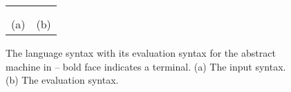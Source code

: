 \newsavebox{\boxLangSyntax}

\begin{lrbox}{\boxLangSyntax}
\begin{minipage}[c]{0.3\linewidth}
\cfgstart
{}
\cfgrule{\thread}{\lp\cfgnt{\cmd}~$\ldots$~$\bot$\rp}
\cfgrule{\cmd}{\lp\cfgt{\sendi}~\cfgt{\num}~\cfgt{\num}\rp}
   \cfgorline{\lp\cfgt{\recvi}~\cfgt{\aid}~\cfgt{\num}~\cfgt{\num}~\cfgt{\aid}\rp}
   \cfgorline{\lp\cfgt{\wait}~\cfgt{\aid}\rp}
   \cfgorline{\lp\cfgt{\barrier}~\cfgt{\aid}\rp}
\cfgrule{\rcvp}{\lp\aid~$\ldots$\rp}
\cfgend
\end{minipage}
\end{lrbox}


\newsavebox{\boxEvalSyntax}
\begin{lrbox}{\boxEvalSyntax}
\begin{minipage}[c]{0.3\linewidth}
\cfgstart
{}
\cfgrule{\epsnd}{\cfgt{\mt}\
   \cfgor\lp\cfgnt{\epsnd}~\lb\lp\cfgt{\num},\cfgt{\num}\rp~$\rightarrow$~\cfgt{\num}\rb\rp}
\cfgrule{\eprcv}{\cfgt{\mt}\
   \cfgor\lp\cfgnt{\eprcv}~\lb\lp\cfgt{\num},\cfgt{\num}\rp~$\rightarrow$~\cfgt{\num}\rb\rp}
\cfgrule{rcv}{\lp\lb\cfgt{\aid}~\cfgt{\num}~\cfgt{\num}\rb\ \ldots\rp}
\cfgrule{\epbarrier}{\cfgt{\mt}\
   \cfgor\lp\cfgnt{\epbarrier}~\lb\cfgnt{\aid}~$\rightarrow$~\cfgt{\num}\rb\rp}
\cfgend
\end{minipage}
\end{lrbox}

\begin{figure}
\begin{center}
\setlength{\tabcolsep}{15pt}
\begin{tabular}{cc}
\scalebox{0.75}{\usebox{\boxLangSyntax}}
&
\scalebox{0.75}{\usebox{\boxEvalSyntax}}
\\ \\
(a) & (b)
\end{tabular}
\end{center}
\caption{The language syntax with its evaluation syntax for the abstract machine in  -- bold face indicates a terminal. (a) The input syntax. (b) The evaluation syntax.}
\label{fig:expr:stx}
\end{figure}

\examplefigthree




